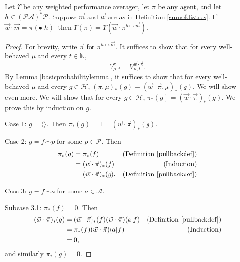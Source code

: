 \documentclass[runningheads]{llncs}
\begin{document}
\begin{proposition}
\label{longproposition}
    Let $\Upsilon$ be any weighted performance averager, let $\pi$ be any agent,
    and let $h\in(\mathcal P\mathcal A)^*\mathcal P$.
    Suppose $\vec m$ and $\vec w$ are as in Definition \ref{sumofdistros}.
    If $\vec w\cdot\vec m = \pi(\bullet|h)$, then
    $
        \Upsilon(\pi)
        =
        \Upsilon(\vec w\cdot \pi^{h\mapsto \vec m}).
    $
\end{proposition}

\begin{proof}
    For brevity, write $\vec\pi$ for $\pi^{h\mapsto \vec m}$. It suffices to
    show that for every well-behaved $\mu$ and every $t\in\mathbb N$,
    \[
        V^{\pi}_{\mu,t}
        =
        V^{\vec w\cdot \vec\pi}_{\mu,t}.
    \]
    By Lemma \ref{basicprobabilitylemma}, it suffices to show that for every
    well-behaved $\mu$ and every $g\in\mathcal H$,
    $
    (\pi,\mu)_*(g)
    =
    (\vec w\cdot\vec\pi,\mu)_*(g)
    $.
    We will show even more. We will show that for every $g\in\mathcal H$,
    $\pi_*(g)=(\vec w\cdot\vec\pi)_*(g)$.
    We prove this by induction on $g$.

    Case 1: $g=\langle\rangle$.
    Then $\pi_*(g)=1
    =(\vec w\cdot\vec\pi)_*(g)$.

    Case 2: $g=f\frown p$ for some $p\in\mathcal P$.
    Then
    \begin{align*}
        \pi_*(g)
            &= \pi_*(f)
                &\mbox{(Definition \ref{pullbackdef})}\\
            &= (\vec w\cdot\vec\pi)_*(f)
                &\mbox{(Induction)}\\
            &= (\vec w\cdot\vec\pi)_*(g).
                &\mbox{(Definition \ref{pullbackdef})}
    \end{align*}

    Case 3: $g=f\frown a$ for some $a\in\mathcal A$.

    Subcase 3.1: $\pi_*(f)=0$.
    Then
    \begin{align*}
        (\vec w\cdot\vec\pi)_*(g)
            &= (\vec w\cdot\vec\pi)_*(f)
            (\vec w\cdot\vec\pi)(a|f)
                &\mbox{(Definition \ref{pullbackdef})}\\
            &= \pi_*(f)(\vec w\cdot\vec\pi)(a|f)
                &\mbox{(Induction)}\\
            &= 0,
    \end{align*}
    and similarly $\pi_*(g)=0$.


\end{proof}
\end{document}
